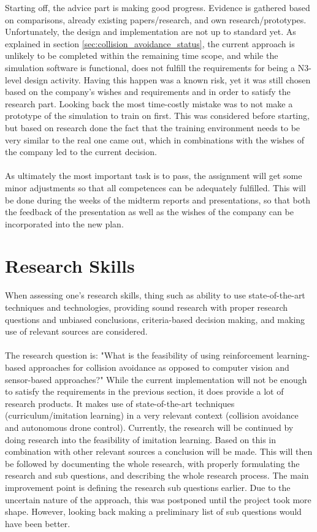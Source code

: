\noindent
Starting off, the advice part is making good progress. Evidence is gathered based on comparisons, already existing papers/research, and own research/prototypes. Unfortunately, the design and implementation are not up to standard yet. As explained in section \ref{sec:collision_avoidance_status}, the current approach is unlikely to be completed within the remaining time scope, and while the simulation software is functional, does not fulfill the requirements for being a N3-level design activity. Having this happen was a known risk, yet it was still chosen based on the company's wishes and requirements and in order to satisfy the research part. Looking back the most time-costly mistake was to not make a prototype of the simulation to train on first. This was considered before starting, but based on research done the fact that the training environment needs to be very similar to the real one came out, which in combinations with the wishes of the company led to the current decision.
\\\\
As ultimately the most important task is to pass, the assignment will get some minor adjustments so that all competences can be adequately fulfilled. This will be done during the weeks of the midterm reports and presentations, so that both the feedback of the presentation as well as the wishes of the company can be incorporated into the new plan.

\section{Research Skills}
When assessing one's research skills, thing such as ability	to use state-of-the-art techniques	and	technologies, providing sound	research with proper research questions and unbiased conclusions, criteria-based decision making, and making use of relevant sources are considered.
\\\\
The research question is: "What is the feasibility of using reinforcement learning-based approaches for collision avoidance as opposed to computer vision and sensor-based approaches?" While the current implementation will not be enough to satisfy the requirements in the previous section, it does provide a lot of research products. It makes use of state-of-the-art techniques (curriculum/imitation learning) in a very relevant context (collision avoidance and autonomous drone control). Currently, the research will be continued by doing research into the feasibility of imitation learning. Based on this in combination with other relevant sources a conclusion will be made. This will then be followed by documenting the whole research, with properly formulating the research and sub questions, and describing the whole research process. The main improvement point is defining the research sub questions earlier. Due to the uncertain nature of the approach, this was postponed until the project took more shape. However, looking back making a preliminary list of sub questions would have been better.

